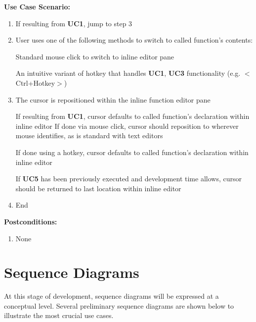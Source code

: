 \documentclass[]{report}
\begin{document}
		\noindent\textbf{Use Case Scenario:}
		
		\begin{enumerate}
			
			\item 
			If resulting from \textbf{UC1}, jump to step 3
			
			\item
			User uses one of the following methods to switch to called function's contents:
			
				\subitem
				Standard mouse click to switch to inline editor pane
				
				\subitem
				An intuitive variant of hotkey that handles \textbf{UC1}, \textbf{UC3} functionality (e.g. $<$Ctrl+Hotkey$>$)
			
			\item 
			The cursor is repositioned within the inline function editor pane
			
				\subitem
				If resulting from \textbf{UC1}, cursor defaults to called function's declaration within inline editor
				\subitem
				If done via mouse click, cursor should reposition to wherever mouse identifies, as is standard with text editors
				
				\subitem
				If done using a hotkey, cursor defaults to called function's declaration within inline editor
				
					\subsubitem
					If \textbf{UC5} has been previously executed and development time allows, cursor should be returned to last location within inline editor
			
			\item
			End
		\end{enumerate}
		
		\noindent\textbf{Postconditions:}
		
		\begin{enumerate}
			
			\item 
			None
			
		\end{enumerate}

\chapter{Sequence Diagrams}

	At this stage of development, sequence diagrams will be expressed at a conceptual level.  Several preliminary sequence diagrams are shown below to illustrate the most crucial use cases.
	
\end{document}
